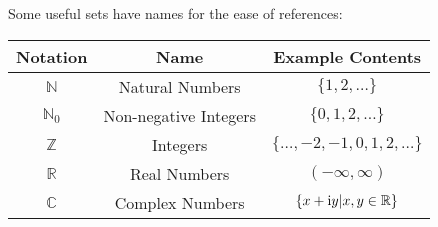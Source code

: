 Some useful sets have names for the ease of references:
\begin{center}
    \begin{tabular}{c||c|c}
        Notation & Name & Example Contents \\
        \hline
        $\mathbb{N}$ & Natural Numbers & $\{1, 2, \dots\}$ \\
        $\mathbb{N}_0$ & Non-negative Integers & $\{0, 1, 2, \dots\}$ \\
        $\mathbb{Z}$ & Integers & $\{\dots, -2, -1, 0, 1, 2, \dots\}$ \\
        $\mathbb{R}$ & Real Numbers & $(-\infty, \infty)$ \\
        $\mathbb{C}$ & Complex Numbers & $\{x + {\rm i} y | x, y \in \mathbb{R}\}$
    \end{tabular}
\end{center}

